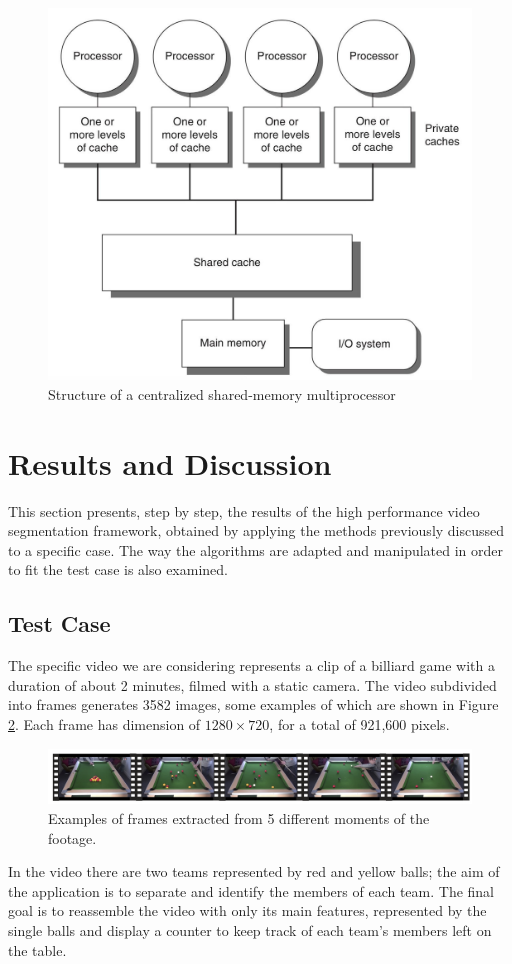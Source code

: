 \documentclass{usiinftr}
\begin{document}
\begin{figure}[h]
	\centering
	\includegraphics[width=0.35\linewidth]{img/multiprocessing}
	\caption{Structure of a centralized shared-memory multiprocessor \cite{15}}
	\label{fig:3}
\end{figure}



\section{Results and Discussion}
This section presents, step by step, the results of the high performance video segmentation framework, obtained by applying the methods previously discussed to a specific case. The way the algorithms are adapted and manipulated in order to fit the test case is also examined. 

\subsection{Test Case}
The specific video we are considering represents a clip of a billiard game with a duration of about 2 minutes, filmed with a static camera. The video subdivided into frames generates 3582 images, some examples of which are shown in Figure \ref{fig:4}. Each frame has dimension of $1280 \times 720$,  for a total of 921,600 pixels.

\begin{figure}[h]
	\centering
	\includegraphics[width=0.98\linewidth]{img/video_frames}
	\caption{Examples of frames extracted from 5 different moments of the footage.}
	\label{fig:4}
\end{figure}

In the video there are two teams represented by red and yellow balls; the aim of the application is to separate and identify the members of each team. The final goal is to reassemble the video with only its main features, represented by the single balls and display a counter to keep track of each team's members left on the table. 
\end{document}

